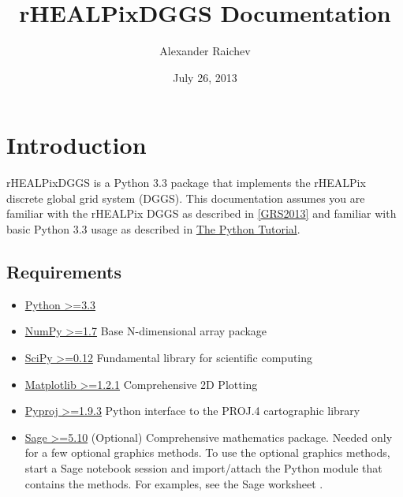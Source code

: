\documentclass[a4paper,12ptopenany,oneside]{sphinxmanual}
\title{rHEALPixDGGS Documentation}
\date{July 26, 2013}
\author{Alexander Raichev}
\begin{document}
\maketitle
\tableofcontents
{}\label{index::doc}



\chapter{Introduction}
\label{introduction:introduction}\label{introduction:welcome-to-scenzgrid-dggs-s-documentation}\label{introduction::doc}
rHEALPixDGGS is a Python 3.3 package that implements the rHEALPix discrete global grid system (DGGS).
This documentation assumes you are familiar with the rHEALPix DGGS as described in {\hyperref[introduction:grs2013]{{[}GRS2013{]}}} and familiar with basic Python 3.3 usage as described in \href{http://docs.python.org/3/tutorial/}{The Python Tutorial}.


\section{Requirements}
\label{introduction:requirements}\begin{itemize}
\item {} 
\href{http://python.org/}{Python \textgreater{}=3.3}

\item {} 
\href{http://www.numpy.org/}{NumPy \textgreater{}=1.7} Base N-dimensional array package

\item {} 
\href{http://www.scipy.org/}{SciPy \textgreater{}=0.12} Fundamental library for scientific computing

\item {} 
\href{http://matplotlib.org/}{Matplotlib \textgreater{}=1.2.1} Comprehensive 2D Plotting

\item {} 
\href{http://code.google.com/p/pyproj/}{Pyproj \textgreater{}=1.9.3}
Python interface to the PROJ.4 cartographic library

\item {} 
\href{http://www.sagemath.org}{Sage \textgreater{}=5.10}
(Optional) Comprehensive mathematics package.
Needed only for a few optional graphics methods.
To use the optional graphics methods, start a Sage notebook session and import/attach the Python module that contains the methods.
For examples, see the Sage worksheet .

\end{itemize}
\end{document}
